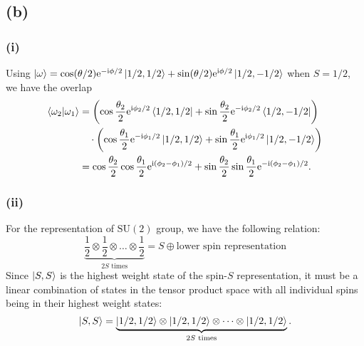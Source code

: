 \documentclass{article}
\newcommand{\ii}{\mathrm{i}}
\newcommand{\me}{\mathrm{e}}
\begin{document}
\subsection*{(b)}
\subsubsection*{(i)}
Using $\ket{\omega}=\cos(\theta/2)\me^{-\ii\phi/2}\ket{1/2,1/2}+\sin(\theta/2)\me^{\ii\phi/2}\ket{1/2,-1/2}$ when $S=1/2$, we have the overlap
\begin{equation}
    \begin{split}
        \bra{\omega_2}\ket{\omega_1} &= \left(\cos\frac{\theta_2}{2}\me^{\ii\phi_2/2}\bra{1/2,1/2}+\sin\frac{\theta_2}{2}\me^{-\ii\phi_2/2}\bra{1/2,-1/2}\right)\\
        &\quad \cdot \left(\cos\frac{\theta_1}{2}\me^{-\ii\phi_1/2}\ket{1/2,1/2}+\sin\frac{\theta_1}{2}\me^{\ii\phi_1/2}\ket{1/2,-1/2}\right)\\
        &=\cos\frac{\theta_2}{2}\cos\frac{\theta_1}{2}\me^{\ii(\phi_2-\phi_1)/2}+\sin\frac{\theta_2}{2}\sin\frac{\theta_1}{2}\me^{-\ii(\phi_2-\phi_1)/2}.
    \end{split}
\end{equation}

\subsubsection*{(ii)}
For the representation of $\text{SU}(2)$ group, we have the following relation:
\begin{equation}\label{eq:su2}
    \underbrace{\frac{1}{2}\otimes\frac{1}{2}\otimes\dots\otimes\frac{1}{2}}_{2S \text{ times}}=S\oplus\text{lower spin representation}
\end{equation}
Since $\ket{S,S}$ is the highest weight state of the spin-$S$ representation, it must be a linear combination of states in the tensor product space with all individual spins being in their highest weight states:
\begin{equation}
    \ket{S,S}=\underbrace{\ket{1/2,1/2}\otimes\ket{1/2,1/2}\otimes\dots\otimes\ket{1/2,1/2}}_{2S \text{ times}}.
\end{equation}
\end{document}
